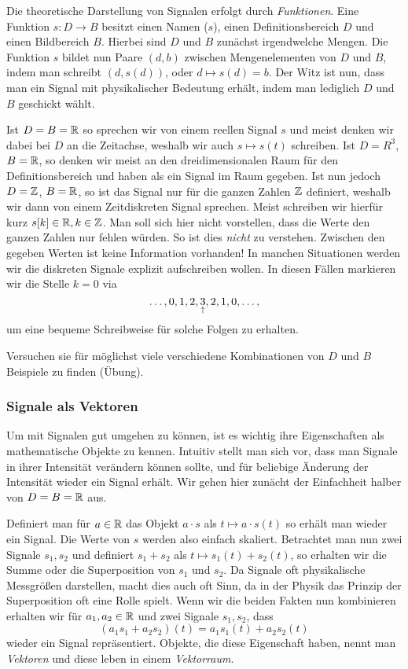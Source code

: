 Die theoretische Darstellung von Signalen erfolgt durch \emph{Funktionen}.
Eine Funktion $s : D \rightarrow B$ besitzt einen Namen ($s$), einen Definitionsbereich $D$ und einen Bildbereich $B$.
Hierbei sind $D$ und $B$ zun\"achst irgendwelche Mengen. 
Die Funktion $s$ bildet nun Paare $(d,b)$ zwischen Mengenelementen von $D$ und $B$, indem man schreibt $(d, s(d))$, oder $d \mapsto s(d) = b$.
Der Witz ist nun, dass man ein Signal mit physikalischer Bedeutung erh\"alt, indem man lediglich $D$ und $B$ geschickt w\"ahlt.

Ist $D = B = \mathbb{R}$ so sprechen wir von einem reellen Signal $s$ und meist denken wir dabei bei $D$ an die Zeitachse, weshalb wir auch $s \mapsto s(t)$ schreiben. 
Ist $D = R^3$, $B = \mathbb{R}$, so denken wir meist an den dreidimensionalen Raum f\"ur den Definitionsbereich und haben als ein Signal im Raum gegeben.
Ist nun jedoch $D = \mathbb{Z}$, $B = \mathbb{R}$, so ist das Signal nur f\"ur die ganzen Zahlen $\mathbb{Z}$ definiert, weshalb wir dann von einem Zeitdiskreten Signal sprechen.
Meist schreiben wir hierf\"ur kurz $s[k] \in \mathbb{R}, k\in \mathbb{Z}$.
Man soll sich hier nicht vorstellen, dass die Werte  den ganzen Zahlen nur fehlen w\"urden. 
So ist dies \emph{nicht} zu verstehen. 
Zwischen den gegeben Werten ist keine Information vorhanden!
In manchen Situationen werden wir die diskreten Signale explizit aufschreiben wollen. 
In diesen F\"allen markieren wir die Stelle $k = 0$ via
\[
\dots, 0, 1, 2, \underset{\uparrow}{3}, 2, 1, 0, \dots,
\]
um eine bequeme Schreibweise f\"ur solche Folgen zu erhalten. 

Versuchen sie f\"ur m\"oglichst viele verschiedene Kombinationen von $D$ und $B$ Beispiele zu finden (\"Ubung).
%
\subsubsection{Signale als Vektoren}\label{sec:signals_vec}
%
Um mit Signalen gut umgehen zu k\"onnen, ist es wichtig ihre Eigenschaften als mathematische Objekte zu kennen.
Intuitiv stellt man sich vor, dass man Signale in ihrer Intensit\"at ver\"andern
k\"onnen sollte, und f\"ur beliebige \"Anderung der Intensit\"at wieder ein Signal erh\"alt.
Wir gehen hier zun\"acht der Einfachheit halber von $D = B = \mathbb{R}$ aus.

Definiert man f\"ur $a \in \mathbb{R}$ das Objekt $a \cdot s$ als $t \mapsto a \cdot s(t)$ so erh\"alt man wieder ein Signal.
Die Werte von $s$ werden also einfach skaliert.
Betrachtet man nun zwei Signale $s_1, s_2$ und definiert $s_1 + s_2$ als $t \mapsto s_1(t) + s_2(t)$, so erhalten wir die Summe oder die Superposition von $s_1$ und $s_2$.
Da Signale oft physikalische Messgr\"o\ss{}en darstellen, macht dies auch oft Sinn, da in der Physik das Prinzip der Superposition oft eine Rolle spielt.
Wenn wir die beiden Fakten nun kombinieren erhalten wir f\"ur $a_1, a_2 \in \mathbb{R}$ und zwei Signale $s_1, s_2$, dass
\[
(a_1 s_1 + a_2 s_2)(t) = a_1 s_1(t) + a_2 s_2(t)
\]
wieder ein Signal repr\"asentiert.
Objekte, die diese Eigenschaft haben, nennt man \emph{Vektoren} und diese leben in einem \emph{Vektorraum}.

